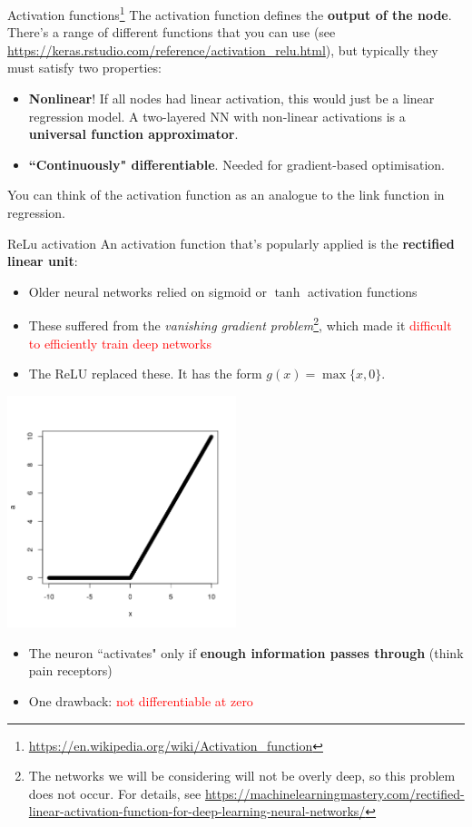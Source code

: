 \documentclass{beamer}
\begin{document}
\begin{frame}{Activation functions\footnote{\url{https://en.wikipedia.org/wiki/Activation_function}}}
The activation function defines the \textbf{output of the node}. There's a range of different functions that you can use (see \url{https://keras.rstudio.com/reference/activation_relu.html}), but typically they must satisfy two properties:  
\begin{itemize}
\item \textbf{Nonlinear}! If all nodes had linear activation, this would just be a linear regression model. A two-layered NN with non-linear activations is a \textbf{universal function approximator}.
\item \textbf{``Continuously" differentiable}. Needed for gradient-based optimisation.
\end{itemize}
You can think of the activation function as an analogue to the link function in regression. 
\end{frame}
\begin{frame}{ReLu activation}
An activation function that's popularly applied is the \textbf{rectified linear unit}:
\begin{itemize}
\item Older neural networks relied on sigmoid or $\tanh$ activation functions
\item These suffered from the \textit{vanishing gradient problem}\footnote{The networks we will be considering will not be overly deep, so this problem does not occur. For details, see \url{https://machinelearningmastery.com/rectified-linear-activation-function-for-deep-learning-neural-networks/}}, which made it \textcolor{red}{difficult to efficiently train deep networks}
\item The ReLU replaced these. It has the form $g(x)=\max\{x,0\}$.
\end{itemize}
\begin{minipage}{0.49\linewidth}
\includegraphics[width=0.5\textwidth]{Images/ReLu.png}
\end{minipage}
\begin{minipage}{0.49\linewidth}
\begin{itemize}
\item The neuron ``activates" only if \textbf{enough information passes through} (think pain receptors)
\item One drawback: \textcolor{red}{not differentiable at zero}
\end{itemize}
\end{minipage}
\end{frame}
\end{document}
